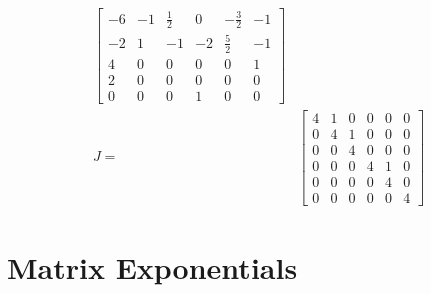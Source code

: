 \begin{solution}
\begin{align*}
\begin{bmatrix}
-6 & -1 & \frac{1}{2} & 0 & -\frac{3}{2} & -1\\
-2 & 1 & -1 & -2 & \frac{5}{2} & -1\\
4 & 0 & 0 & 0 & 0 & 1\\
2 & 0 & 0 & 0 & 0 & 0\\
0 & 0 & 0 & 1 & 0 & 0
\end{bmatrix} \\
J =&
\begin{bmatrix}
4&1&0&0&0&0\\ 
0&4&1&0&0&0\\ 
0&0&4&0&0&0\\ 
0&0&0&4&1&0\\ 
0&0&0&0&4&0\\ 
0&0&0&0&0&4
\end{bmatrix}
\end{align*}
\end{solution}

\section{Matrix Exponentials}
\label{sec:matexp}

